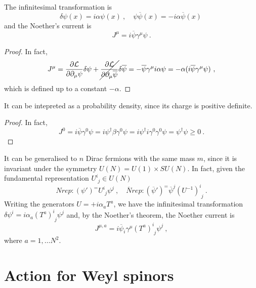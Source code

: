     The infinitesimal transformation is 
    \begin{equation*}
        \delta \psi(x) = i \alpha \psi(x) ~, \quad \psi \overline \psi(x) = - i \alpha \overline \psi (x) ~
    \end{equation*}
    and the Noether's current is 
    \begin{equation*}
        J^\mu = i \overline \psi \gamma^\mu \psi ~.
    \end{equation*}
    \begin{proof}
        In fact, 
        \begin{equation*}
            J^\mu = \frac{\partial\mathcal L}{\partial\partial_\mu \psi} \delta \psi + \cancel{\frac{\partial\mathcal L}{\partial\partial_\mu  \overline \psi}} \delta \overline \psi = - \overline \psi \gamma^\mu i \alpha \psi = - \alpha (i \overline \psi \gamma^\mu \psi) ~,
        \end{equation*}
        which is defined up to a constant $- \alpha$.
    \end{proof}
    It can be intepreted as a probability density, since its charge is positive definite. 
    \begin{proof}
        In fact, 
        \begin{equation*}
            J^0 = i \overline \psi \gamma^0 \psi = i \psi^\dagger \beta \gamma^0 \psi = i \psi^\dagger i \gamma^0 \gamma^0 \psi = \psi^\dagger \psi \geq 0 ~.
        \end{equation*}
    \end{proof}

    It can be generalised to $n$ Dirac fermions with the same mass $m$, since it is invariant under the symmetry $U(N) = U(1) \times SU(N)$. In fact, given the fundamental representation $U^i_{\phantom i j} \in U(N)$
    \begin{equation*}
        N rep : (\psi')^ = U^i_{\phantom i j} \psi^j ~, \quad \overline N rep : (\overline \psi')^ = \overline \psi^j (U^{-1})^i_{\phantom i j} ~.
    \end{equation*}
    Writing the generators $U = \mathbb + i \alpha_a T^a$, we have the infinitesimal transformation $\delta \psi^i = i \alpha_a (T^a)^i_{\phantom i j} \psi^j$ and, by the Noether's theorem, the Noether current is 
    \begin{equation*}
        J^{\mu , a} = i \overline \psi_i \gamma^\mu (T^a)^i_{\phantom i j} \psi^j ~,
    \end{equation*}
    where $a = 1, \ldots N^2$.

\section{Action for Weyl spinors}

